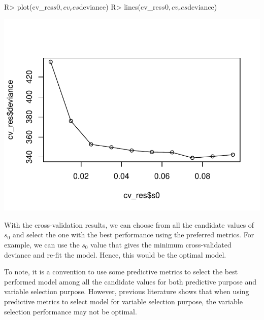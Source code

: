 \documentclass[
]{jss}
\begin{document}
\begin{CodeChunk}
\begin{CodeInput}
R> plot(cv_res$s0, cv_res$deviance)
R> lines(cv_res$s0, cv_res$deviance)
\end{CodeInput}


\begin{center}\includegraphics{BHAM_software_files/figure-latex/unnamed-chunk-9-1} \end{center}

\end{CodeChunk}

With the cross-validation results, we can choose from all the candidate
values of \(s_0\) and select the one with the best performance using the
preferred metrics. For example, we can use the \(s_0\) value that gives
the minimum cross-validated deviance and re-fit the model. Hence, this
would be the optimal model.

\begin{CodeChunk}
\end{CodeChunk}

To note, it is a convention to use some predictive metrics to select the
best performed model among all the candidate values for both predictive
purpose and variable selection purpose. However, previous literature
\citep{Wu2019} shows that when using predictive metrics to select model
for variable selection purpose, the variable selection performance may
not be optimal.
\end{document}
